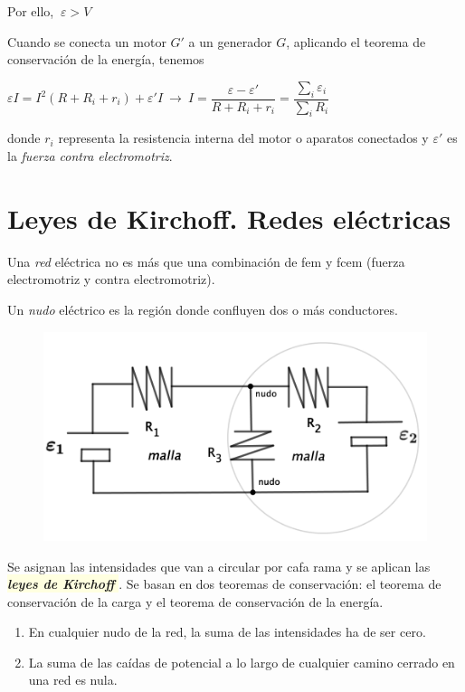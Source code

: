 Por ello, $ \ \varepsilon > V$

Cuando se conecta un motor $G'$ a un generador $G$, aplicando el teorema de conservación de la energía, tenemos

$\varepsilon I=I^2(R+R_i+r_i)+\varepsilon' I \ \to \ I=\dfrac{\varepsilon -\varepsilon'}{R+R_i+r_i}= \dfrac{\sum_i \varepsilon_i}{\sum_i R_i}$

donde $r_i$ representa la resistencia interna del motor o aparatos conectados y $\varepsilon'$ es la \emph{fuerza contra electromotriz}.

\section{Leyes de Kirchoff. Redes eléctricas}

\begin{multicols}{2}
Una \emph{red} eléctrica no es más que una combinación de fem y fcem (fuerza electromotriz y contra electromotriz).

Un \emph{nudo} eléctrico es la región donde confluyen dos o más conductores.
	\begin{figure}[H]
	\centering
	\includegraphics[width=.5\textwidth]{imagenes/imagenes25/T25IM07.png}
\end{figure}
\end{multicols}
Se asignan las intensidades que van a circular por cafa rama y se aplican las \colorbox{LightYellow}{ \emph{\textbf{leyes de Kirchoff}} }. Se basan en dos teoremas de conservación: el teorema de conservación de la carga y el teorema de conservación de la energía.

\begin{miparrafodestacado}
\begin{enumerate}
	\item En cualquier nudo de la red, la suma de las intensidades ha de ser cero.
	\item La suma de las caídas de potencial a lo largo de cualquier camino cerrado en una red es nula.
\end{enumerate}
\end{miparrafodestacado}

